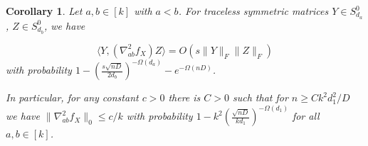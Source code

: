 \documentclass{article}
\newtheorem{corollary}[theorem]{Corollary}
\newcommand\smallSym{S}
\newcommand\samp{x}
\newcommand\rv{X}
\newcommand{\AR}[1]{{\color{orange}[AR: #1]}}
\newcommand{\TODO}[1]{{\color{blue}[TODO: #1]}}
\begin{document}


\begin{corollary}\label{cor:off-diag-hess} Let $a,b \in [k]$ with $a < b$. For traceless symmetric matrices $Y \in \smallSym^0_{d_a}$, $Z \in \smallSym^0_{d_b}$, we have 

$$ \langle Y,  \left( \nabla^2_{ab} f_{\rv} \right) Z \rangle
= O \left(s \|Y\|_F\|Z\|_F\right)
$$
with probability %
$1 - \left(\frac {s \sqrt{nD}}{2d_b}\right)^{ - \Omega(d_a)} - e^{- \Omega(nD)}$.

In particular, for any constant $c>0$ there is $C>0$ such that for $n \geq C k^2 d_1^2/D$ we have $\|\nabla^2_{ab} f_{\rv}\|_0 \leq c/k$ with probability $1 - k^2 \left(\frac {\sqrt{nD}}{kd_1}\right)^{ - \Omega(d_1)}$ for all $a,b \in [k]$. 


\end{corollary}
\end{document}
